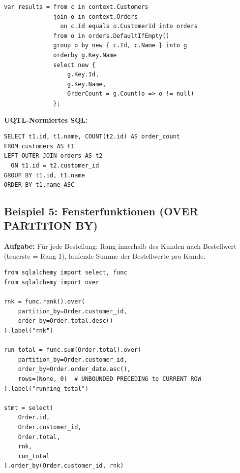 \begin{lstlisting}[style=csharpstyle, caption={Beispiel 4 -- C\# (LEFT JOIN)},
  label=lst:bsp4_cs]
var results = from c in context.Customers
              join o in context.Orders
                on c.Id equals o.CustomerId into orders
              from o in orders.DefaultIfEmpty()
              group o by new { c.Id, c.Name } into g
              orderby g.Key.Name
              select new {
                  g.Key.Id,
                  g.Key.Name,
                  OrderCount = g.Count(o => o != null)
              };
\end{lstlisting}

\begin{successbox}
\textbf{UQTL-Normiertes SQL:}
\begin{lstlisting}[style=sqlstyle, numbers=none]
SELECT t1.id, t1.name, COUNT(t2.id) AS order_count
FROM customers AS t1
LEFT OUTER JOIN orders AS t2
  ON t1.id = t2.customer_id
GROUP BY t1.id, t1.name
ORDER BY t1.name ASC
\end{lstlisting}
\end{successbox}

\subsection{Beispiel 5: Fensterfunktionen (OVER PARTITION BY)}
\label{subsec:bsp5}

\textbf{Aufgabe:} Für jede Bestellung: Rang innerhalb des Kunden nach Bestellwert
(teuerste = Rang 1), laufende Summe der Bestellwerte pro Kunde.

\begin{lstlisting}[style=pythonstyle, caption={Beispiel 5 -- Python (Window Functions)},
  label=lst:bsp5_py]
from sqlalchemy import select, func
from sqlalchemy import over

rnk = func.rank().over(
    partition_by=Order.customer_id,
    order_by=Order.total.desc()
).label("rnk")

run_total = func.sum(Order.total).over(
    partition_by=Order.customer_id,
    order_by=Order.order_date.asc(),
    rows=(None, 0)  # UNBOUNDED PRECEDING to CURRENT ROW
).label("running_total")

stmt = select(
    Order.id,
    Order.customer_id,
    Order.total,
    rnk,
    run_total
).order_by(Order.customer_id, rnk)
\end{lstlisting}

